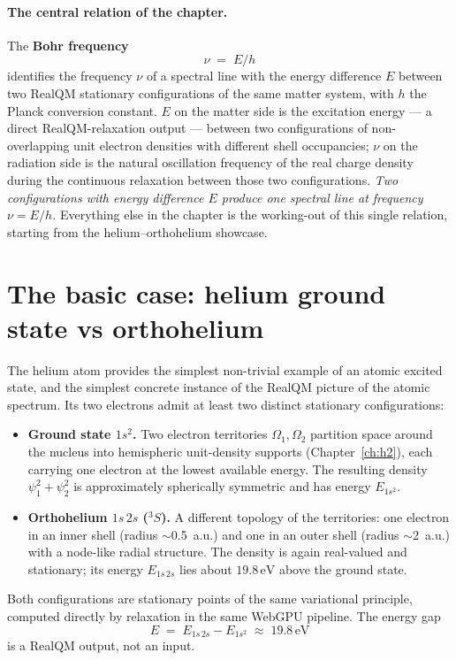 \paragraph{The central relation of the chapter.}
The \textbf{Bohr frequency}
\begin{equation}\label{eq:bohr-central}
\boxed{\;\nu \;=\; E/h\;}
\end{equation}
identifies the frequency $\nu$ of a spectral line with the energy difference $E$ between two RealQM stationary configurations of the same matter system, with $h$ the Planck conversion constant. $E$ on the matter side is the excitation energy --- a direct RealQM-relaxation output --- between two configurations of non-overlapping unit electron densities with different shell occupancies; $\nu$ on the radiation side is the natural oscillation frequency of the real charge density during the continuous relaxation between those two configurations. \emph{Two configurations with energy difference $E$ produce one spectral line at frequency $\nu = E/h$.} Everything else in the chapter is the working-out of this single relation, starting from the helium--orthohelium showcase.

\section{The basic case: helium ground state vs orthohelium}\label{sec:helium-orthohelium-basic}

The helium atom provides the simplest non-trivial example of an atomic excited state, and the simplest concrete instance of the RealQM picture of the atomic spectrum. Its two electrons admit at least two distinct stationary configurations:
\begin{itemize}
\item \textbf{Ground state $1s^2$.} Two electron territories $\Omega_1, \Omega_2$ partition space around the nucleus into hemispheric unit-density supports (Chapter~\ref{ch:h2}), each carrying one electron at the lowest available energy. The resulting density $\psi_1^2 + \psi_2^2$ is approximately spherically symmetric and has energy $E_{1s^2}$.
\item \textbf{Orthohelium $1s\,2s$ ($^3S$).} A different topology of the territories: one electron in an inner shell (radius $\sim$0.5~a.u.) and one in an outer shell (radius $\sim$2~a.u.) with a node-like radial structure. The density is again real-valued and stationary; its energy $E_{1s\,2s}$ lies about $19.8\,\mathrm{eV}$ above the ground state.
\end{itemize}
Both configurations are stationary points of the same variational principle, computed directly by relaxation in the same WebGPU pipeline. The energy gap
\[
E \;=\; E_{1s\,2s} - E_{1s^2} \;\approx\; 19.8\,\mathrm{eV}
\]
is a RealQM output, not an input.

